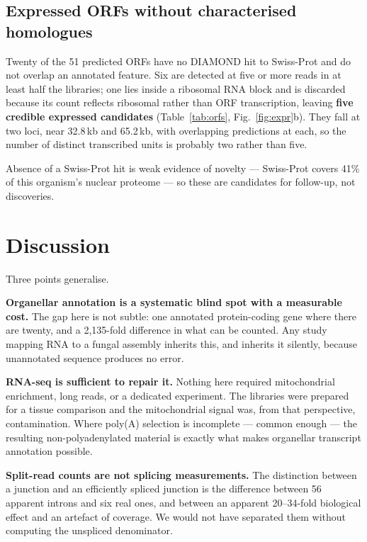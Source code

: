 \subsection{Expressed ORFs without characterised homologues}

Twenty of the 51 predicted ORFs have no DIAMOND hit to Swiss-Prot and do not overlap an
annotated feature. Six are detected at five or more reads in at least half the libraries; one
lies inside a ribosomal RNA block and is discarded because its count reflects ribosomal rather
than ORF transcription, leaving \textbf{five credible expressed candidates}
(Table~\ref{tab:orfs}, Fig.~\ref{fig:expr}b). They fall at two loci, near 32.8\,kb and
65.2\,kb, with overlapping predictions at each, so the number of distinct transcribed units is
probably two rather than five.

Absence of a Swiss-Prot hit is weak evidence of novelty --- Swiss-Prot covers 41\% of this
organism's nuclear proteome --- so these are candidates for follow-up, not discoveries.

\section{Discussion}

Three points generalise.

\textbf{Organellar annotation is a systematic blind spot with a measurable cost.} The gap here
is not subtle: one annotated protein-coding gene where there are twenty, and a 2,135-fold
difference in what can be counted. Any study mapping RNA to a fungal assembly inherits this,
and inherits it silently, because unannotated sequence produces no error.

\textbf{RNA-seq is sufficient to repair it.} Nothing here required mitochondrial enrichment,
long reads, or a dedicated experiment. The libraries were prepared for a tissue comparison and
the mitochondrial signal was, from that perspective, contamination. Where poly(A) selection is
incomplete --- common enough --- the resulting non-polyadenylated material is exactly what makes
organellar transcript annotation possible.

\textbf{Split-read counts are not splicing measurements.} The distinction between a junction
and an efficiently spliced junction is the difference between 56 apparent introns and six real
ones, and between an apparent 20--34-fold biological effect and an artefact of coverage. We
would not have separated them without computing the unspliced denominator.

